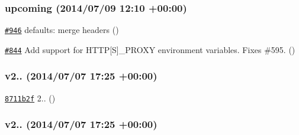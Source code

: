 \subsubsection*{upcoming (2014/07/09 12\+:10 +00\+:00)}


\begin{DoxyItemize}
\item \href{https://github.com/mikeal/request/pull/946}{\tt \#946} defaults\+: merge headers ()
\item \href{https://github.com/mikeal/request/pull/844}{\tt \#844} Add support for H\+T\+T\+P\mbox{[}S\mbox{]}\+\_\+\+P\+R\+O\+X\+Y environment variables. Fixes \#595. ()
\end{DoxyItemize}

\subsubsection*{v2.. (2014/07/07 17\+:25 +00\+:00)}


\begin{DoxyItemize}
\item \href{https://github.com/mikeal/request/commit/8711b2f3489553a7ddae69fa8c9f538182c9d5c8}{\tt 8711b2f} 2.. ()
\end{DoxyItemize}

\subsubsection*{v2.. (2014/07/07 17\+:25 +00\+:00)}



